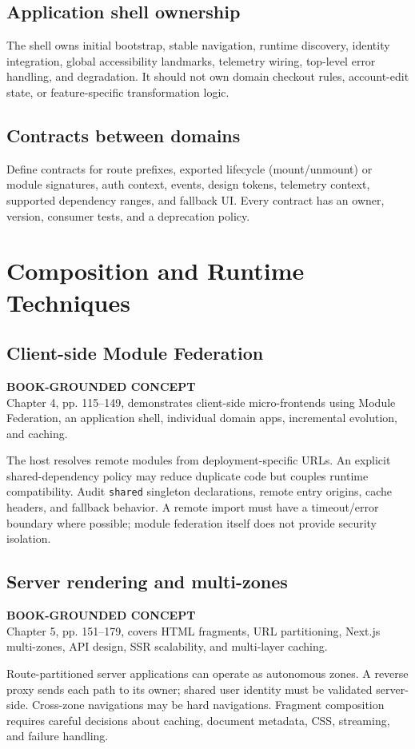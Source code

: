 \documentclass[11pt,letterpaper,oneside]{report}
\newcommand{\based}[1]{\begin{sourcebox}\textbf{BOOK-GROUNDED CONCEPT}\\#1\end{sourcebox}}
\begin{document}
\section{Application shell ownership}
The shell owns initial bootstrap, stable navigation, runtime discovery, identity integration, global accessibility landmarks, telemetry wiring, top-level error handling, and degradation. It should not own domain checkout rules, account-edit state, or feature-specific transformation logic.
\section{Contracts between domains}
Define contracts for route prefixes, exported lifecycle (mount/unmount) or module signatures, auth context, events, design tokens, telemetry context, supported dependency ranges, and fallback UI. Every contract has an owner, version, consumer tests, and a deprecation policy.
\chapter{Composition and Runtime Techniques}
\section{Client-side Module Federation}
\based{Chapter 4, pp. 115--149, demonstrates client-side micro-frontends using Module Federation, an application shell, individual domain apps, incremental evolution, and caching.}
The host resolves remote modules from deployment-specific URLs. An explicit shared-dependency policy may reduce duplicate code but couples runtime compatibility. Audit \texttt{shared} singleton declarations, remote entry origins, cache headers, and fallback behavior. A remote import must have a timeout/error boundary where possible; module federation itself does not provide security isolation.
\section{Server rendering and multi-zones}
\based{Chapter 5, pp. 151--179, covers HTML fragments, URL partitioning, Next.js multi-zones, API design, SSR scalability, and multi-layer caching.}
Route-partitioned server applications can operate as autonomous zones. A reverse proxy sends each path to its owner; shared user identity must be validated server-side. Cross-zone navigations may be hard navigations. Fragment composition requires careful decisions about caching, document metadata, CSS, streaming, and failure handling.
\end{document}
